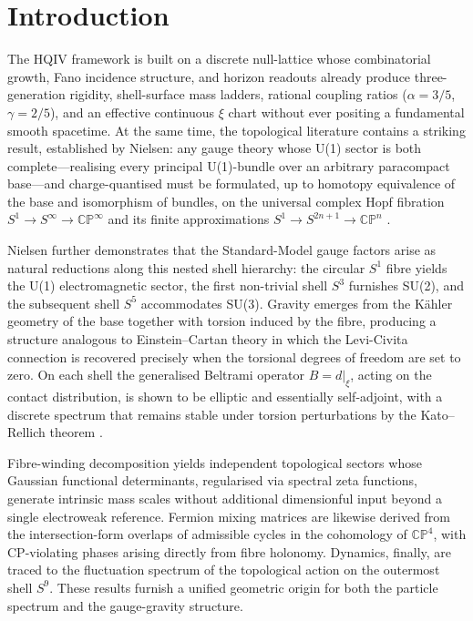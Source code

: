 \documentclass[11pt]{article}
\begin{document}
\section{Introduction}

The HQIV framework is built on a discrete null-lattice whose combinatorial
growth, Fano incidence structure, and horizon readouts already produce
three-generation rigidity, shell-surface mass ladders, rational coupling
ratios ($\alpha=3/5$, $\gamma=2/5$), and an effective continuous $\xi$
chart without ever positing a fundamental smooth spacetime. At the same
time, the topological literature contains a striking result, established
by Nielsen: any gauge theory whose U(1) sector is both complete—realising
every principal U(1)-bundle over an arbitrary paracompact base—and
charge-quantised must be formulated, up to homotopy equivalence of the
base and isomorphism of bundles, on the universal complex Hopf fibration
$S^1\to S^\infty\to\mathbb{CP}^\infty$ and its finite approximations
$S^1\to S^{2n+1}\to\mathbb{CP}^n$ \cite{NielsenTUFT2026}.

Nielsen further demonstrates that the Standard-Model gauge factors arise
as natural reductions along this nested shell hierarchy: the circular
$S^1$ fibre yields the U(1) electromagnetic sector, the first non-trivial
shell $S^3$ furnishes SU(2), and the subsequent shell $S^5$ accommodates
SU(3). Gravity emerges from the Kähler geometry of the base together with
torsion induced by the fibre, producing a structure analogous to
Einstein–Cartan theory in which the Levi-Civita connection is recovered
precisely when the torsional degrees of freedom are set to zero. On each
shell the generalised Beltrami operator $B = d|_\xi$, acting on the
contact distribution, is shown to be elliptic and essentially
self-adjoint, with a discrete spectrum that remains stable under
torsion perturbations by the Kato–Rellich theorem \cite{NielsenTUFT2026}.

Fibre-winding decomposition yields independent topological sectors whose
Gaussian functional determinants, regularised via spectral zeta functions,
generate intrinsic mass scales without additional dimensionful input
beyond a single electroweak reference. Fermion mixing matrices are
likewise derived from the intersection-form overlaps of admissible cycles
in the cohomology of $\mathbb{CP}^4$, with CP-violating phases arising
directly from fibre holonomy. Dynamics, finally, are traced to the
fluctuation spectrum of the topological action on the outermost shell
$S^9$. These results furnish a unified geometric origin for both the
particle spectrum and the gauge-gravity structure.
\end{document}
